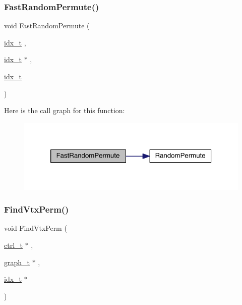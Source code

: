 \subsubsection{\texorpdfstring{Fast\+Random\+Permute()}{FastRandomPermute()}}
{\footnotesize\ttfamily void Fast\+Random\+Permute (\begin{DoxyParamCaption}\item[{\hyperlink{a00876_aaa5262be3e700770163401acb0150f52}{idx\+\_\+t}}]{,  }\item[{\hyperlink{a00876_aaa5262be3e700770163401acb0150f52}{idx\+\_\+t} $\ast$}]{,  }\item[{\hyperlink{a00876_aaa5262be3e700770163401acb0150f52}{idx\+\_\+t}}]{ }\end{DoxyParamCaption})}

Here is the call graph for this function\+:\nopagebreak
\begin{figure}[H]
\begin{center}
\leavevmode
\includegraphics[width=320pt]{a00951_ad0dfda007894503b9653ff3ae65ed54b_cgraph}
\end{center}
\end{figure}
\mbox{\label{a00951_a8e01b7330c2c8b67d901d6c6bb22da47}} 
\subsubsection{\texorpdfstring{Find\+Vtx\+Perm()}{FindVtxPerm()}}
{\footnotesize\ttfamily void Find\+Vtx\+Perm (\begin{DoxyParamCaption}\item[{\hyperlink{a00742}{ctrl\+\_\+t} $\ast$}]{,  }\item[{\hyperlink{a00734}{graph\+\_\+t} $\ast$}]{,  }\item[{\hyperlink{a00876_aaa5262be3e700770163401acb0150f52}{idx\+\_\+t} $\ast$}]{ }\end{DoxyParamCaption})}

